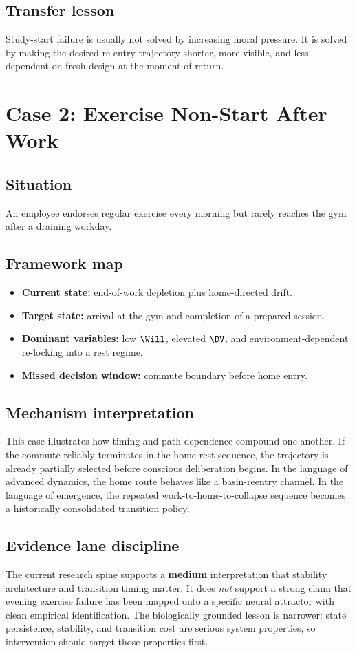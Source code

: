 \subsection*{Transfer lesson}
Study-start failure is usually not solved by increasing moral pressure. It is
solved by making the desired re-entry trajectory shorter, more visible, and
less dependent on fresh design at the moment of return.

\section{Case 2: Exercise Non-Start After Work}

\subsection*{Situation}
An employee endorses regular exercise every morning but rarely reaches the gym
after a draining workday.

\subsection*{Framework map}
\begin{itemize}[nosep]
  \item \textbf{Current state:} end-of-work depletion plus home-directed drift.
  \item \textbf{Target state:} arrival at the gym and completion of a prepared
        session.
  \item \textbf{Dominant variables:} low $\Will$, elevated $\DV$, and
        environment-dependent re-locking into a rest regime.
  \item \textbf{Missed decision window:} commute boundary before home entry.
\end{itemize}

\subsection*{Mechanism interpretation}
This case illustrates how timing and path dependence compound one another. If
the commute reliably terminates in the home-rest sequence, the trajectory is
already partially selected before conscious deliberation begins. In the
language of advanced dynamics, the home route behaves like a basin-reentry
channel. In the language of emergence, the repeated work-to-home-to-collapse
sequence becomes a historically consolidated transition policy.

\subsection*{Evidence lane discipline}
The current research spine supports a \textbf{medium} interpretation that
stability architecture and transition timing matter. It does \emph{not}
support a strong claim that evening exercise failure has been mapped onto a
specific neural attractor with clean empirical identification. The biologically
grounded lesson is narrower: state persistence, stability, and transition cost
are serious system properties, so intervention should target those properties
first.

